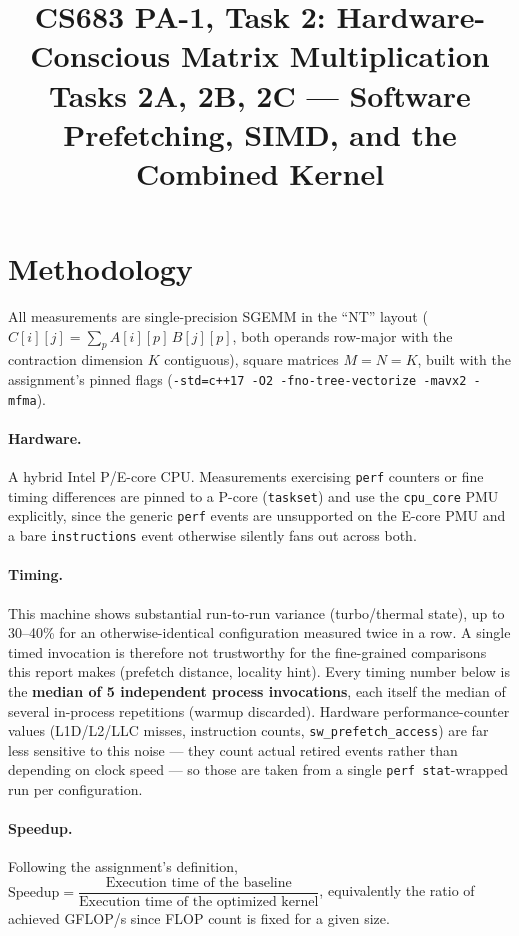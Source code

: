 \documentclass[11pt]{article}
\title{CS683 PA-1, Task 2: Hardware-Conscious Matrix Multiplication \\
       \large Tasks 2A, 2B, 2C --- Software Prefetching, SIMD, and the Combined Kernel}
\author{}
\date{}
\begin{document}
\maketitle

\section*{Methodology}

All measurements are single-precision SGEMM in the ``NT'' layout
($C[i][j] = \sum_p A[i][p]\,B[j][p]$, both operands row-major with the contraction
dimension $K$ contiguous), square matrices $M{=}N{=}K$, built with the assignment's
pinned flags (\texttt{-std=c++17 -O2 -fno-tree-vectorize -mavx2 -mfma}).

\paragraph{Hardware.} A hybrid Intel P/E-core CPU. Measurements exercising \texttt{perf}
counters or fine timing differences are pinned to a P-core (\texttt{taskset}) and use the
\texttt{cpu\_core} PMU explicitly, since the generic \texttt{perf} events are unsupported
on the E-core PMU and a bare \texttt{instructions} event otherwise silently fans out
across both.

\paragraph{Timing.} This machine shows substantial run-to-run variance (turbo/thermal
state), up to 30--40\% for an otherwise-identical configuration measured twice in a row.
A single timed invocation is therefore not trustworthy for the fine-grained comparisons
this report makes (prefetch distance, locality hint). Every timing number below is the
\textbf{median of 5 independent process invocations}, each itself the median of several
in-process repetitions (warmup discarded). Hardware performance-counter values (L1D/L2/LLC
misses, instruction counts, \texttt{sw\_prefetch\_access}) are far less sensitive to this
noise --- they count actual retired events rather than depending on clock speed --- so
those are taken from a single \texttt{perf stat}-wrapped run per configuration.

\paragraph{Speedup.} Following the assignment's definition,
$\text{Speedup} = \dfrac{\text{Execution time of the baseline}}{\text{Execution time of the optimized kernel}}$,
equivalently the ratio of achieved GFLOP/s since FLOP count is fixed for a given size.
\end{document}
